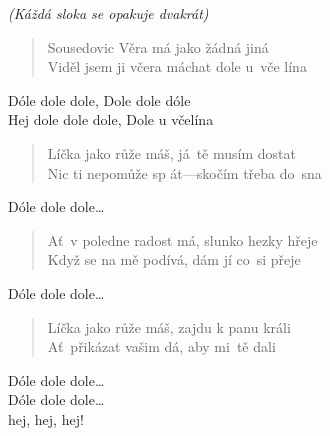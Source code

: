 
\begin{song}{}
  \begin{solo}
    \textit{(Káždá sloka se opakuje dvakrát)}
  \end{solo}
\begin{verse}
    Sousedovic Věra má jako žádná jiná  \\
    Viděl jsem ji včera máchat dole u~vče lína 
\end{verse}
\begin{refren}
    Dóle dole dole, Dole dole dóle  \\
    Hej dole dole dole, Dole u včelína 
\end{refren}
\begin{verse}
    Líčka jako růže máš, já~tě musím dostat  \\
    Nic ti nepomůže sp át---skočím třeba do~sna 
\end{verse}
\begin{refren}
    Dóle dole dole\ldots 
\end{refren}
\begin{verse}
    Ať~v poledne radost má, slunko hezky hřeje  \\
    Když se na mě podívá, dám jí co~si přeje 
\end{verse}
\begin{refren}
    Dóle dole dole\ldots 
\end{refren}
\begin{verse}
    Líčka jako růže máš, zajdu k panu králi  \\
    Ať~přikázat vašim dá, aby mi~tě dali 
\end{verse}
\begin{refren}
    Dóle dole dole\ldots  \\
    Dóle dole dole\ldots  \\
    hej, hej, hej!
\end{refren}
\end{song}
\pagebreak
